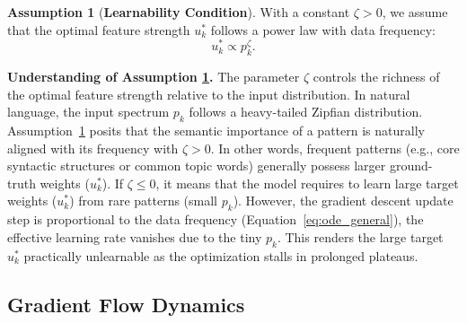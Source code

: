 \documentclass{article}
\theoremstyle{plain}
\theoremstyle{definition}
\newtheorem{assumption}[theorem]{Assumption}
\theoremstyle{remark}
\begin{document}
\begin{assumption}[\textbf{Learnability Condition}]\label{assump:learnability}
    With a constant $\zeta > 0$, we assume that the optimal feature strength $u_k^*$ follows a power law with data frequency:
    \begin{equation*}
        u_k^* \propto p_k^\zeta.
    \end{equation*}
\end{assumption}
\textbf{Understanding of Assumption \ref{assump:learnability}.}\quad
The parameter $\zeta$ controls the richness of the optimal feature strength relative to the input distribution.
In natural language, the input spectrum $p_k$ follows a heavy-tailed Zipfian distribution. Assumption~\ref{assump:learnability} posits that the semantic importance of a pattern is naturally aligned with its frequency with $\zeta > 0$. In other words, frequent patterns (e.g., core syntactic structures or common topic words) generally possess larger ground-truth weights ($u_k^*$).
If $\zeta \le 0$, it means that the model requires to learn large target weights ($u_k^*$) from rare patterns (small $p_k$). However, the gradient descent update step is proportional to the data frequency (Equation~\eqref{eq:ode_general}), the effective learning rate vanishes due to the tiny $p_k$. This renders the large target $u_k^*$ practically unlearnable as the optimization stalls in prolonged plateaus.










\subsection{Gradient Flow Dynamics}
\end{document}
